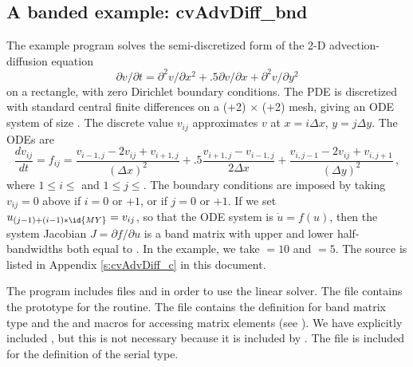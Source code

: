 

\subsection{A banded example: cvAdvDiff\_bnd}\label{ss:cvAdvDiff}

The example program  solves the semi-discretized form of
the 2-D advection-diffusion equation
\vspace*{-.1in}
\begin{equation}
\label{eq:adeqn}
\partial v / \partial t = \partial^2 v / \partial x^2
  + .5 \partial v / \partial x + \partial^2 v / \partial y^2
\end{equation}
on a rectangle, with zero Dirichlet boundary conditions. The PDE is 
discretized with standard central finite differences on a 
(+2) $\times$ (+2) mesh, giving an ODE system of size
.  The discrete value $v_{ij}$ approximates $v$ at $x = i \Delta x$,
$y = j \Delta y$. The ODEs are
\begin{equation}
\label{eq:cdiff}
\frac{dv_{ij}}{dt} = f_{ij} =
         \frac{v_{i-1,j} - 2 v_{ij} + v_{i+1,j}}{(\Delta x)^2}
       + .5  \frac{v_{i+1,j} - v_{i-1,j}}{2 \Delta x}
       + \frac{v_{i,j-1} - 2 v_{ij} + v_{i,j+1}}{(\Delta y)^2} \, ,
\end{equation}
where $1 \leq i \leq $ and $1 \leq j \leq $.  The boundary
conditions are imposed by taking $v_{ij} = 0$ above if $i = 0$
or $ + 1$, or if $j = 0$ or $ + 1$. 
If we set $u_{(j-1)+(i-1)*\id{MY}} = v_{ij}$, so that the ODE system is
$\dot{u} = f(u)$, then the system Jacobian $J = \partial f / \partial u$ is
a band matrix with upper and lower half-bandwidths both equal to .
In the example, we take  $= 10$ and  $= 5$.
The source is listed in Appendix \ref{s:cvAdvDiff_c} in this document.

The  program includes files  and
 in order to use the {\cvband} linear solver. The 
file contains the prototype for the  routine. The 
file contains the definition for band matrix type  and the
 and  macros for accessing matrix
elements (see ).
We have explicitly included , but this is not necessary because
it is included by .  The file  is
included for the definition of the serial  type.


